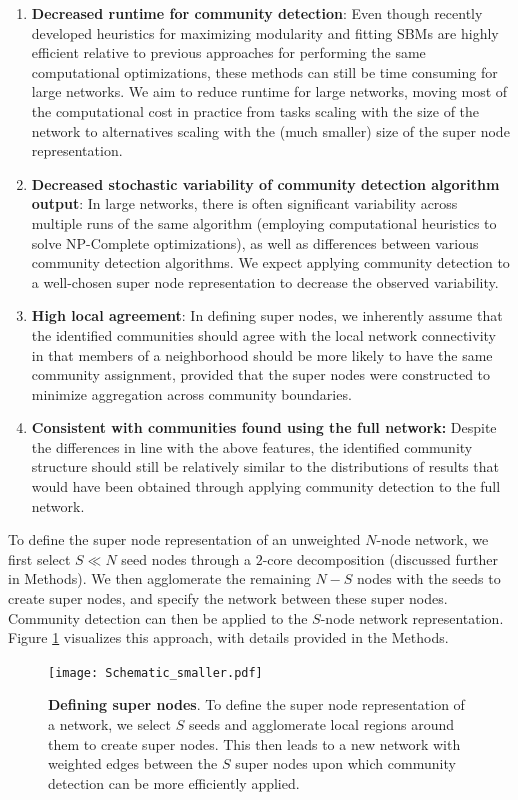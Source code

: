 \begin{enumerate}
\setlength\itemsep{0mm}
\item {\bf Decreased runtime for community detection}: Even though recently developed heuristics for maximizing modularity \cite{blondel} and fitting SBMs \cite{tiagosbm} are highly efficient relative to previous approaches for performing the same computational optimizations, these methods can still be time consuming for large networks. We aim to  reduce runtime for large networks, moving most of the computational cost in practice from tasks scaling with the size of the network to alternatives scaling with the (much smaller) size of the super node representation.
\item {\bf Decreased stochastic variability of community detection algorithm output}: In large networks, there is often significant variability across multiple runs of the same algorithm (employing computational heuristics to solve NP-Complete optimizations), as well as differences between various community detection algorithms. We expect applying community detection to a well-chosen super node representation to decrease the observed variability.
\item {\bf High local agreement}: In defining super nodes, we inherently assume that the identified communities should agree with the local network connectivity in that members of a neighborhood should be more likely to have the same community assignment, provided that the super nodes were constructed to minimize aggregation across community boundaries.
\item {\bf Consistent with communities found using the full network:} Despite the differences in line with the above features, the identified community structure should still be relatively similar to the distributions of results that would have been obtained through applying community detection to the full network.
\end{enumerate}

To define the super node representation of an unweighted $N$-node network, we first select $S\ll N$ seed nodes through a $2$-core decomposition (discussed further in Methods). We then agglomerate the remaining $N-S$ nodes with the seeds to create super nodes, and specify the network between these super nodes. Community detection can then be applied to the $S$-node network representation. Figure \ref{Fig1} visualizes this approach, with details provided in the Methods.

\begin{figure}[t!]
\centering
\texttt{[image: Schematic\_smaller.pdf]}
\caption{{\bf Defining super nodes}. To define the super node representation of a network, we select $S$ seeds and agglomerate local regions around them to create super nodes. This then leads to a new network with weighted edges between the $S$ super nodes upon which community detection can be more efficiently applied.}
\label{Fig1}
\end{figure}

